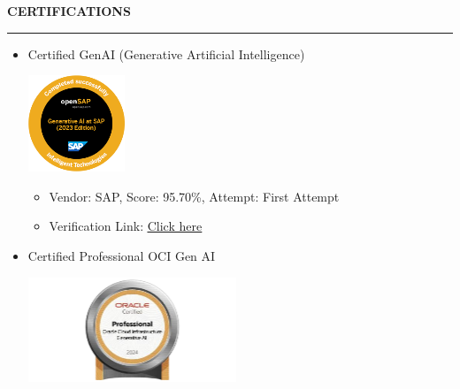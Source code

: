\documentclass[a4paper]{article}
\begin{document}
\begin{center}
  \textbf{CERTIFICATIONS}
  \rule{\textwidth}{0.4pt}  %
\end{center}

\begin{itemize}
  \item
    Certified GenAI (Generative Artificial Intelligence)
    \hfill  %
    \begin{minipage}[t]{0.15\textwidth}
      \includegraphics[width=\linewidth]{media/image23.png}
    \end{minipage}

    \begin{itemize}
    \item Vendor: SAP, Score: 95.70\%, Attempt: First Attempt
    \item Verification Link: \href{https://open.sap.com/verify/xogaz-dimeh-rybiv-foser-teted}{\ul{Click here}}
    \end{itemize}
  
  \item
    Certified Professional OCI Gen AI
    \hfill  %
    \begin{minipage}[t]{0.15\textwidth}
      \includegraphics[width=\linewidth]{media/image24.png}
    \end{minipage}


\end{itemize}
\end{document}
